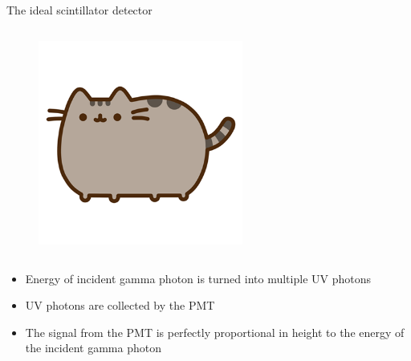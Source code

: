 \begin{columnframe}{The ideal scintillator detector}
    \begin{column}{0.5\textwidth}
        \begin{figure}
            \centering
            \includegraphics[width=0.6\textwidth, frame]{images/pusheen.png}
        \end{figure}
    \end{column}
    \begin{column}{0.5\textwidth}
        \begin{itemize}
            \item Energy of incident gamma photon is turned into multiple UV photons
            \item UV photons are collected by the PMT
            \item The signal from the PMT is perfectly proportional in height to the energy of  the incident gamma photon
        \end{itemize}
    \end{column}
\end{columnframe}


